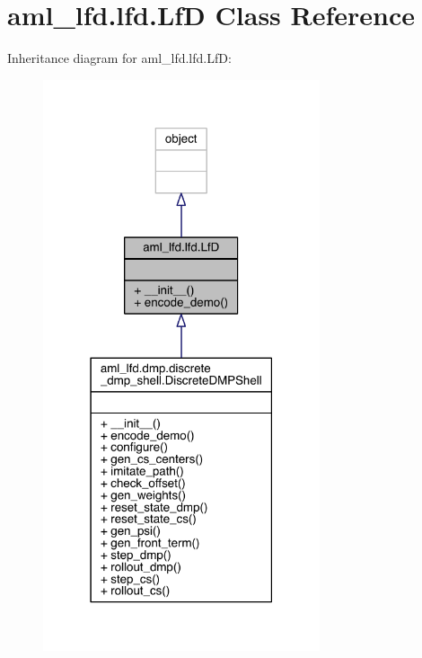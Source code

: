 \hypertarget{classaml__lfd_1_1lfd_1_1_lf_d}{}\section{aml\+\_\+lfd.\+lfd.\+LfD Class Reference}
\label{classaml__lfd_1_1lfd_1_1_lf_d}


Inheritance diagram for aml\+\_\+lfd.\+lfd.\+LfD\+:\nopagebreak
\begin{figure}[H]
\begin{center}
\leavevmode
\includegraphics[width=231pt]{classaml__lfd_1_1lfd_1_1_lf_d__inherit__graph}
\end{center}
\end{figure}



